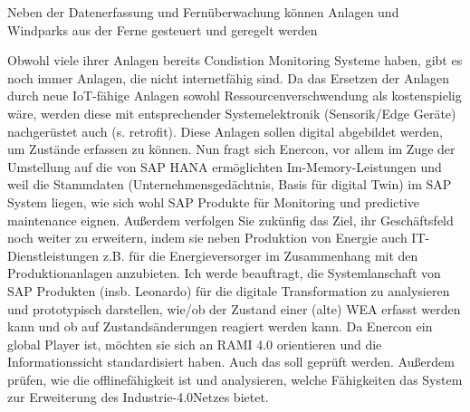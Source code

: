 Neben der Datenerfassung und Fernüberwachung können Anlagen und Windparks aus der Ferne gesteuert und geregelt werden


 Obwohl viele ihrer Anlagen bereits Condistion Monitoring Systeme haben, gibt es noch immer Anlagen, die nicht internetfähig sind. Da das Ersetzen der Anlagen durch neue IoT-fähige Anlagen sowohl Ressourcenverschwendung als kostenspielig wäre, werden diese mit entsprechender Systemelektronik (Sensorik/Edge Geräte) nachgerüstet auch (s. retrofit). Diese Anlagen sollen digital abgebildet werden, um Zustände erfassen zu können. Nun fragt sich Enercon, vor allem im Zuge der Umstellung auf die von SAP HANA ermöglichten Im-Memory-Leistungen und weil die Stammdaten (Unternehmensgedächtnis, Basis für digital Twin) im SAP System liegen, wie sich wohl SAP Produkte für Monitoring und predictive maintenance eignen.
Außerdem verfolgen Sie zukünfig das Ziel, ihr Geschäftsfeld noch weiter zu erweitern, indem sie neben Produktion von Energie auch IT-Dienstleistungen z.B. für die Energieversorger im Zusammenhang mit den Produktionanlagen anzubieten.
Ich werde beauftragt, die Systemlanschaft von SAP Produkten (insb. Leonardo) für die digitale Transformation zu analysieren und prototypisch darstellen, wie/ob der Zustand einer (alte) WEA erfasst werden kann und ob auf Zustandsänderungen reagiert werden kann. Da Enercon ein global Player ist, möchten sie sich an RAMI 4.0 orientieren und die Informationssicht standardisiert haben. Auch das soll geprüft werden. Außerdem prüfen, wie die offlinefähigkeit ist und analysieren, welche Fähigkeiten das System zur Erweiterung des Industrie-4.0Netzes bietet.

